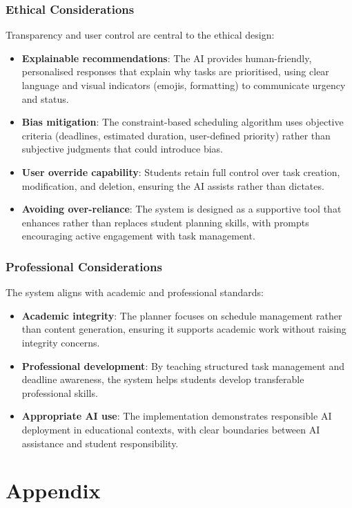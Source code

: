 \documentclass[12pt]{article}
\begin{document}
\subsubsection{Ethical Considerations}
Transparency and user control are central to the ethical design:
\begin{itemize}
    \item \textbf{Explainable recommendations}: The AI provides human-friendly, personalised responses that explain why tasks are prioritised, using clear language and visual indicators (emojis, formatting) to communicate urgency and status.
    \item \textbf{Bias mitigation}: The constraint-based scheduling algorithm uses objective criteria (deadlines, estimated duration, user-defined priority) rather than subjective judgments that could introduce bias.
    \item \textbf{User override capability}: Students retain full control over task creation, modification, and deletion, ensuring the AI assists rather than dictates.
    \item \textbf{Avoiding over-reliance}: The system is designed as a supportive tool that enhances rather than replaces student planning skills, with prompts encouraging active engagement with task management.
\end{itemize}

\subsubsection{Professional Considerations}
The system aligns with academic and professional standards:
\begin{itemize}
    \item \textbf{Academic integrity}: The planner focuses on schedule management rather than content generation, ensuring it supports academic work without raising integrity concerns.
    \item \textbf{Professional development}: By teaching structured task management and deadline awareness, the system helps students develop transferable professional skills.
    \item \textbf{Appropriate AI use}: The implementation demonstrates responsible AI deployment in educational contexts, with clear boundaries between AI assistance and student responsibility.
\end{itemize}
\newpage
{}
\printbibliography
\section*{Appendix}
\appendix
\end{document}
